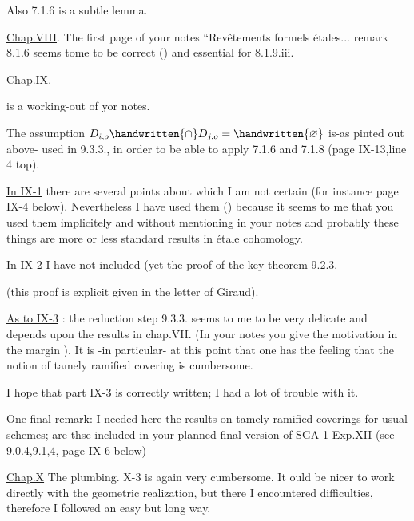 Also 7.1.6 is a subtle lemma.

\uline{Chap.VIII}. The first page of your notes ``Revêtements formels étales... remark 8.1.6 seems tome to be correct (\handwritten{!}) and essential for 8.1.9.iii.

\uline{Chap.IX}.

 is a working-out of yor notes.

The assumption $D_{i,o}\handwritten{\cap}D_{j,o}=\handwritten{\varnothing}$ is-as pinted out above- used in 9.3.3., in order to be able to apply 7.1.6 and 7.1.8 (page IX-13,line 4 top).

\uline{In IX-1} there are several points about which I am not certain (for instance page IX-4 below). Nevertheless I have used them (\handwritten{!}) because it seems to me that you used them implicitely and without mentioning in your notes and probably these things are more or less standard results in étale cohomology.

\uline{In IX-2} I have not included (yet the proof of the key-theorem 9.2.3.

(this proof is explicit given in the letter of Giraud).

\uline{As to IX-3} : the reduction step 9.3.3. seems to me to be very delicate and depends upon the results in chap.VII. (In your notes you give the motivation in the margin \handwritten{!}). It is -in particular- at this point that one has the feeling that the notion of tamely ramified covering is cumbersome.

I hope that part IX-3 is correctly written; I had a lot of trouble with it.

One final remark: I needed here the results on tamely ramified coverings for \uline{usual schemes}; are thse included in your planned final version of SGA 1 Exp.XII (see 9.0.4,9.1,4, page IX-6 below)

\uline{Chap.X} The plumbing. X-3 is again very cumbersome. It ould be nicer to work directly with the geometric realization, but there I encountered difficulties, therefore I followed an easy but long way.

